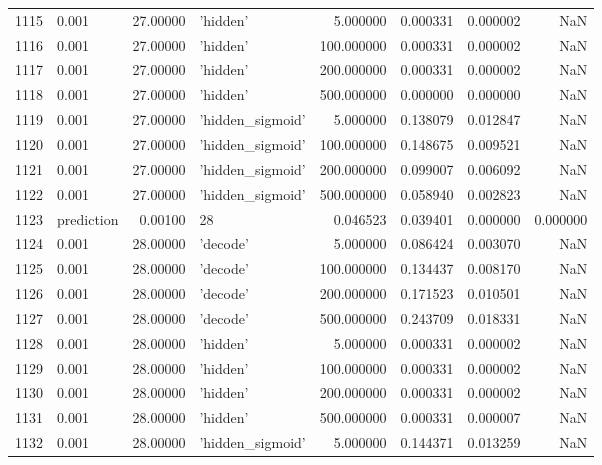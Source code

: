 \documentclass[10pt,a4paper]{article}
\begin{document}
\begin{tabular}{llrlrrrr}
1115 &       0.001 &  27.00000 &           'hidden' &    5.000000 &  0.000331 &  0.000002 &       NaN \\
1116 &       0.001 &  27.00000 &           'hidden' &  100.000000 &  0.000331 &  0.000002 &       NaN \\
1117 &       0.001 &  27.00000 &           'hidden' &  200.000000 &  0.000331 &  0.000002 &       NaN \\
1118 &       0.001 &  27.00000 &           'hidden' &  500.000000 &  0.000000 &  0.000000 &       NaN \\
1119 &       0.001 &  27.00000 &   'hidden\_sigmoid' &    5.000000 &  0.138079 &  0.012847 &       NaN \\
1120 &       0.001 &  27.00000 &   'hidden\_sigmoid' &  100.000000 &  0.148675 &  0.009521 &       NaN \\
1121 &       0.001 &  27.00000 &   'hidden\_sigmoid' &  200.000000 &  0.099007 &  0.006092 &       NaN \\
1122 &       0.001 &  27.00000 &   'hidden\_sigmoid' &  500.000000 &  0.058940 &  0.002823 &       NaN \\
1123 &  prediction &   0.00100 &                 28 &    0.046523 &  0.039401 &  0.000000 &  0.000000 \\
1124 &       0.001 &  28.00000 &           'decode' &    5.000000 &  0.086424 &  0.003070 &       NaN \\
1125 &       0.001 &  28.00000 &           'decode' &  100.000000 &  0.134437 &  0.008170 &       NaN \\
1126 &       0.001 &  28.00000 &           'decode' &  200.000000 &  0.171523 &  0.010501 &       NaN \\
1127 &       0.001 &  28.00000 &           'decode' &  500.000000 &  0.243709 &  0.018331 &       NaN \\
1128 &       0.001 &  28.00000 &           'hidden' &    5.000000 &  0.000331 &  0.000002 &       NaN \\
1129 &       0.001 &  28.00000 &           'hidden' &  100.000000 &  0.000331 &  0.000002 &       NaN \\
1130 &       0.001 &  28.00000 &           'hidden' &  200.000000 &  0.000331 &  0.000002 &       NaN \\
1131 &       0.001 &  28.00000 &           'hidden' &  500.000000 &  0.000331 &  0.000007 &       NaN \\
1132 &       0.001 &  28.00000 &   'hidden\_sigmoid' &    5.000000 &  0.144371 &  0.013259 &       NaN \\

\end{tabular}
\end{document}
